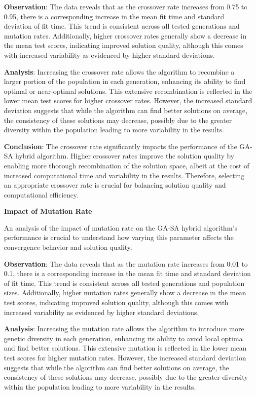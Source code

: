 \documentclass{article}
\begin{document}
    \textbf{Observation}: The data reveals that as the crossover rate increases from 0.75 to 0.95, there is a corresponding increase in the mean fit time and standard deviation of fit time. This trend is consistent across all tested generations and mutation rates. Additionally, higher crossover rates generally show a decrease in the mean test scores, indicating improved solution quality, although this comes with increased variability as evidenced by higher standard deviations.

    \textbf{Analysis}: Increasing the crossover rate allows the algorithm to recombine a larger portion of the population in each generation, enhancing its ability to find optimal or near-optimal solutions. This extensive recombination is reflected in the lower mean test scores for higher crossover rates. However, the increased standard deviation suggests that while the algorithm can find better solutions on average, the consistency of these solutions may decrease, possibly due to the greater diversity within the population leading to more variability in the results.

    \textbf{Conclusion}: The crossover rate significantly impacts the performance of the GA-SA hybrid algorithm. Higher crossover rates improve the solution quality by enabling more thorough recombination of the solution space, albeit at the cost of increased computational time and variability in the results. Therefore, selecting an appropriate crossover rate is crucial for balancing solution quality and computational efficiency.

    \textbf{Impact of Mutation Rate}

    An analysis of the impact of mutation rate on the GA-SA hybrid algorithm’s performance is crucial to understand how varying this parameter affects the convergence behavior and solution quality.

    \textbf{Observation}: The data reveals that as the mutation rate increases from 0.01 to 0.1, there is a corresponding increase in the mean fit time and standard deviation of fit time. This trend is consistent across all tested generations and population sizes. Additionally, higher mutation rates generally show a decrease in the mean test scores, indicating improved solution quality, although this comes with increased variability as evidenced by higher standard deviations.

    \textbf{Analysis}: Increasing the mutation rate allows the algorithm to introduce more genetic diversity in each generation, enhancing its ability to avoid local optima and find better solutions. This extensive mutation is reflected in the lower mean test scores for higher mutation rates. However, the increased standard deviation suggests that while the algorithm can find better solutions on average, the consistency of these solutions may decrease, possibly due to the greater diversity within the population leading to more variability in the results.
\end{document}
